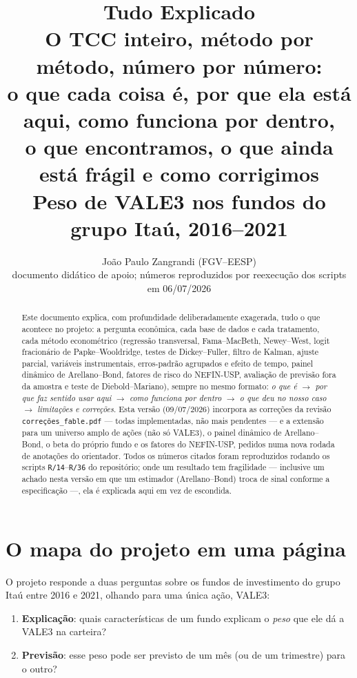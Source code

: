 \documentclass[11pt,a4paper]{article}
\title{\textbf{Tudo Explicado}\\[6pt]
\large O TCC inteiro, método por método, número por número:\\
o que cada coisa é, por que ela está aqui, como funciona por dentro,\\
o que encontramos, o que ainda está frágil e como corrigimos\\[6pt]
\normalsize Peso de VALE3 nos fundos do grupo Itaú, 2016--2021}
\author{João Paulo Zangrandi (FGV--EESP) \\ \small documento didático de apoio; números reproduzidos por reexecução dos scripts em 06/07/2026}
\date{}
\begin{document}
\maketitle

\begin{abstract}
\noindent Este documento explica, com profundidade deliberadamente exagerada, tudo o que acontece
no projeto: a pergunta econômica, cada base de dados e cada tratamento, cada método econométrico
(regressão transversal, Fama--MacBeth, Newey--West, logit fracionário de Papke--Wooldridge, testes
de Dickey--Fuller, filtro de Kalman, ajuste parcial, variáveis instrumentais, erros-padrão
agrupados e efeito de tempo, painel dinâmico de Arellano--Bond, fatores de risco do NEFIN-USP,
avaliação de previsão fora da amostra e teste de Diebold--Mariano), sempre no mesmo formato:
\emph{o que é} $\to$ \emph{por que faz sentido usar aqui} $\to$ \emph{como funciona por dentro}
$\to$ \emph{o que deu no nosso caso} $\to$ \emph{limitações e correções}. Esta versão (09/07/2026)
incorpora as correções da revisão \texttt{correções\_fable.pdf} --- todas implementadas, não mais
pendentes --- e a extensão para um universo amplo de ações (não só VALE3), o painel dinâmico de
Arellano--Bond, o beta do próprio fundo e os fatores do NEFIN-USP, pedidos numa nova rodada de
anotações do orientador. Todos os números citados foram reproduzidos rodando os scripts
\texttt{R/14}--\texttt{R/36} do repositório; onde um resultado tem fragilidade --- inclusive um
achado nesta versão em que um estimador (Arellano--Bond) troca de sinal conforme a especificação
---, ela é explicada aqui em vez de escondida.
\end{abstract}

\newpage
\tableofcontents
\newpage

\section{O mapa do projeto em uma página}
\label{sec:mapa}

O projeto responde a duas perguntas sobre os fundos de investimento do grupo Itaú entre 2016 e
2021, olhando para uma única ação, VALE3:

\begin{enumerate}[topsep=2pt,itemsep=1pt]
\item \textbf{Explicação}: quais características de um fundo explicam o \emph{peso} que ele dá a
VALE3 na carteira?
\item \textbf{Previsão}: esse peso pode ser previsto de um mês (ou de um trimestre) para o outro?
\end{enumerate}
\end{document}

